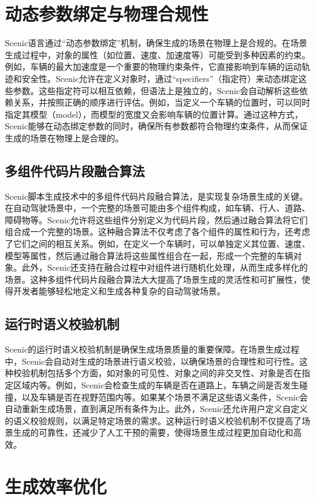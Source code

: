 \section{动态参数绑定与物理合规性}

Scenic语言通过“动态参数绑定”机制，确保生成的场景在物理上是合规的。在场景生成过程中，对象的属性（如位置、速度、加速度等）可能受到多种因素的约束。例如，车辆的最大加速度是一个重要的物理约束条件，它直接影响到车辆的运动轨迹和安全性。Scenic允许在定义对象时，通过“specifiers”（指定符）来动态绑定这些参数。这些指定符可以相互依赖，但语法上是独立的，Scenic会自动解析这些依赖关系，并按照正确的顺序进行评估。例如，当定义一个车辆的位置时，可以同时指定其模型（model），而模型的宽度又会影响车辆的位置计算。通过这种方式，Scenic能够在动态绑定参数的同时，确保所有参数都符合物理约束条件，从而保证生成的场景在物理上是合理的。
\subsection{多组件代码片段融合算法}
Scenic脚本生成技术中的多组件代码片段融合算法，是实现复杂场景生成的关键。在自动驾驶场景中，一个完整的场景可能由多个组件构成，如车辆、行人、道路、障碍物等。Scenic允许将这些组件分别定义为代码片段，然后通过融合算法将它们组合成一个完整的场景。这种融合算法不仅考虑了各个组件的属性和行为，还考虑了它们之间的相互关系。例如，在定义一个车辆时，可以单独定义其位置、速度、模型等属性，然后通过融合算法将这些属性组合在一起，形成一个完整的车辆对象。此外，Scenic还支持在融合过程中对组件进行随机化处理，从而生成多样化的场景。这种多组件代码片段融合算法大大提高了场景生成的灵活性和可扩展性，使得开发者能够轻松地定义和生成各种复杂的自动驾驶场景。
\subsection{运行时语义校验机制}
Scenic的运行时语义校验机制是确保生成场景质量的重要保障。在场景生成过程中，Scenic会自动对生成的场景进行语义校验，以确保场景的合理性和可行性。这种校验机制包括多个方面，如对象的可见性、对象之间的非交叉性、对象是否在指定区域内等。例如，Scenic会检查生成的车辆是否在道路上，车辆之间是否发生碰撞，以及车辆是否在视野范围内等。如果某个场景不满足这些语义条件，Scenic会自动重新生成场景，直到满足所有条件为止。此外，Scenic还允许用户定义自定义的语义校验规则，以满足特定场景的需求。这种运行时语义校验机制不仅提高了场景生成的可靠性，还减少了人工干预的需要，使得场景生成过程更加自动化和高效。

\section{生成效率优化}
